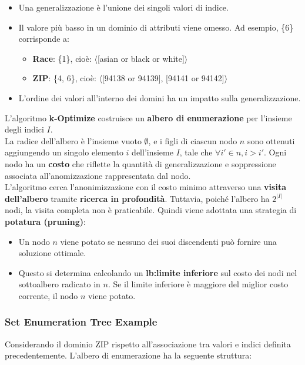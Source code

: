\documentclass{report}
\begin{document}
\begin{itemize}
    \item Una generalizzazione è l'unione dei singoli valori di indice.
    \item Il valore più basso in un dominio di attributi viene omesso. Ad esempio, \{6\} corrisponde a:
    \begin{itemize}
        \item \textbf{Race}: \{1\}, cioè: $\langle$[asian or black or white]$\rangle$
        \item \textbf{ZIP}: \{4, 6\}, cioè: $\langle$[94138 or 94139], [94141 or 94142]$\rangle$
    \end{itemize}
    \item L'ordine dei valori all'interno dei domini ha un impatto sulla generalizzazione.
\end{itemize}

\noindent L'algoritmo \textbf{k-Optimize} costruisce un \textbf{albero di enumerazione} per l'insieme degli indici $I$. \\
La radice dell'albero è l'insieme vuoto $\emptyset$, e i figli di ciascun nodo $n$ sono ottenuti aggiungendo un singolo elemento $i$ dell'insieme $I$, tale che $\forall i' \in n, i > i'$. 
Ogni nodo ha un \textbf{costo} che riflette la quantità di generalizzazione e soppressione associata all'anomizzazione rappresentata dal nodo. \\
L'algoritmo cerca l'anonimizzazione con il costo minimo attraverso una \textbf{visita dell'albero} tramite \textbf{ricerca in profondità}. 
Tuttavia, poiché l'albero ha $2^{|I|}$ nodi, la visita completa non è praticabile. Quindi viene adottata una strategia di \textbf{potatura (pruning)}:

\begin{itemize}
    \item Un nodo $n$ viene potato se nessuno dei suoi discendenti può fornire una soluzione ottimale.
    \item Questo si determina calcolando un \textbf{lb:limite inferiore} sul costo dei nodi nel sottoalbero radicato in $n$. 
    Se il limite inferiore è maggiore del miglior costo corrente, il nodo $n$ viene potato.
\end{itemize}

\subsubsection{Set Enumeration Tree Example}
Considerando il dominio ZIP rispetto all'associazione tra valori e indici definita precedentemente. L'albero di enumerazione ha la seguente struttura:
\end{document}
